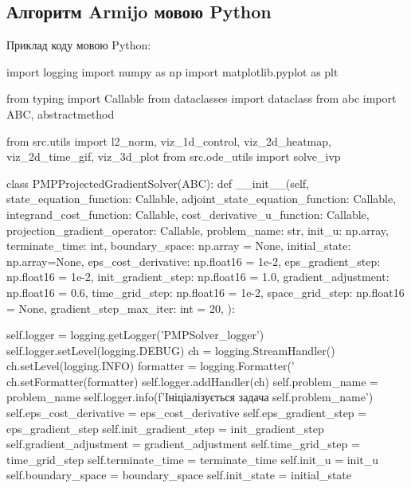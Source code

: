\documentclass[a4paper,12pt]{extreport}
\begin{document}
\subsection*{Алгоритм Armijo мовою Python}
Приклад коду мовою Python:
\begin{python}[utf8]
import logging
import numpy as np
import matplotlib.pyplot as plt
    
    
from typing import Callable
from dataclasses import dataclass
from abc import ABC, abstractmethod
    
from src.utils import l2_norm, viz_1d_control, viz_2d_heatmap, viz_2d_time_gif, viz_3d_plot
from src.ode_utils import solve_ivp
    
    
class PMPProjectedGradientSolver(ABC):
        def __init__(self, state_equation_function: Callable, adjoint_state_equation_function: Callable,
                     integrand_cost_function: Callable, cost_derivative_u_function: Callable,
                     projection_gradient_operator: Callable, problem_name: str, init_u: np.array,
                     terminate_time: int, boundary_space: np.array = None, initial_state: np.array=None,
                     eps_cost_derivative: np.float16 = 1e-2, eps_gradient_step: np.float16 = 1e-2,
                     init_gradient_step: np.float16 = 1.0,
                     gradient_adjustment: np.float16 = 0.6,
                     time_grid_step: np.float16 = 1e-2, space_grid_step: np.float16 = None,
                     gradient_step_max_iter: int = 20,
                     ):
    
            self.logger = logging.getLogger('PMPSolver_logger')
            self.logger.setLevel(logging.DEBUG)
            ch = logging.StreamHandler()
            ch.setLevel(logging.INFO)
            formatter = logging.Formatter('%
            ch.setFormatter(formatter)
            self.logger.addHandler(ch)
            self.problem_name = problem_name
            self.logger.info(f'Ініціалізується задача {self.problem_name}')
            self.eps_cost_derivative = eps_cost_derivative
            self.eps_gradient_step = eps_gradient_step
            self.init_gradient_step = init_gradient_step
            self.gradient_adjustment = gradient_adjustment
            self.time_grid_step = time_grid_step
            self.terminate_time = terminate_time
            self.init_u = init_u
            self.boundary_space = boundary_space
            self.init_state = initial_state
    

\end{python}
\end{document}

